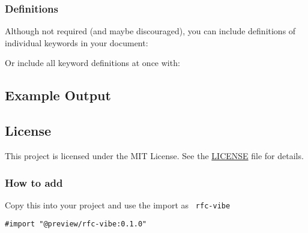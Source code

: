 \subsubsection{Definitions}\label{definitions}

Although not required (and maybe discouraged), you can include
definitions of individual keywords in your document:

\begin{Shaded}
\begin{Highlighting}[]
\end{Highlighting}
\end{Shaded}

Or include all keyword definitions at once with:

\begin{Shaded}
\begin{Highlighting}[]
\end{Highlighting}
\end{Shaded}

\subsection{Example Output}\label{example-output}


\subsection{License}\label{license}

This project is licensed under the MIT License. See the
\href{https://github.com/typst/packages/raw/main/packages/preview/rfc-vibe/0.1.0/LICENSE}{LICENSE}
file for details.

\subsubsection{How to add}\label{how-to-add}

Copy this into your project and use the import as \texttt{\ rfc-vibe\ }

\begin{verbatim}
#import "@preview/rfc-vibe:0.1.0"
\end{verbatim}

